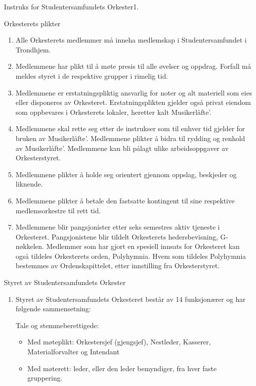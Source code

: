 \begin{instruks}{Instruks for Studentersamfundets Orkester}{1. }{ }
\begin{instruksledd}{Orkesterets plikter}
    \begin{enumerate}
        \item Alle Orkesterets medlemmer må inneha medlemskap i Studentersamfundet i Trondhjem.
        \item Medlemmene har plikt til å møte presis til alle øvelser og oppdrag. Forfall må meldes
styret i de respektive
grupper i rimelig tid.
        \item Medlemmene er erstatningspliktig ansvarlig for noter og alt materiell som eies eller
disponeres av Orkesteret.
Erstatningsplikten gjelder også privat eiendom som oppbevares i Orkesterets lokaler, heretter kalt
Musikerlåfte'.
        \item Medlemmene skal rette seg etter de instrukser som til enhver tid gjelder for bruken av
Musikerlåfte'.
Medlemmene plikter å bidra til rydding og renhold av Musikerlåfte'. Medlemmene kan bli pålagt ulike
arbeidsoppgaver av Orkesterstyret.
        \item Medlemmene plikter å holde seg orientert gjennom oppslag, beskjeder og liknende.
        \item Medlemmene plikter å betale den fastsatte kontingent til sine respektive
medlemsorkestre til rett tid.
        \item Medlemmene blir pangsjonister etter seks semestres aktiv tjeneste i Orkesteret.
Pangsjonistene blir tildelt
Orkesterets hedersbevisning, G-nøkkelen. Medlemmer som har gjort en spesiell innsats for Orkesteret
kan
også tildeles Orkesterets orden, Polyhymnia. Hvem som tildeles Polyhymnia bestemmes av
Ordenskapittelet,
etter innstilling fra Orkesterstyret.
    \end{enumerate}
\end{instruksledd}

\begin{instruksledd}{Styret av Studentersamfundets Orkester}
    \begin{enumerate}
        \item Styret av Studentersamfundets Orkesteret består av 14 funksjonærer og har følgende
sammensetning:

        Tale og stemmeberettigede:
        \begin{itemize}
            \item Med møteplikt: Orkestersjef (gjengsjef), Nestleder, Kasserer, Materialforvalter og
Intendant
            \item Med møterett: leder, eller den leder bemyndiger, fra hver faste gruppering.
        \end{itemize}


\end{enumerate}
\end{instruksledd}
\end{instruks}
